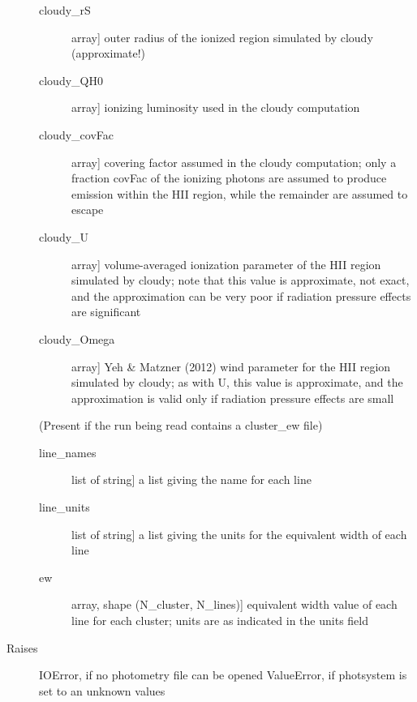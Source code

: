 \documentclass[letterpaper,10pt,english]{sphinxmanual}
\begin{document}
\begin{fulllineitems}
\begin{description}
\begin{description}
\item[{cloudy\_rS}] \leavevmode{[}array{]}
outer radius of the ionized region simulated by cloudy (approximate!)

\item[{cloudy\_QH0}] \leavevmode{[}array{]}
ionizing luminosity used in the cloudy computation

\item[{cloudy\_covFac}] \leavevmode{[}array{]}
covering factor assumed in the cloudy computation; only a
fraction covFac of the ionizing photons are assumed to
produce emission within the HII region, while the remainder
are assumed to escape

\item[{cloudy\_U}] \leavevmode{[}array{]}
volume-averaged ionization parameter of the HII region
simulated by cloudy; note that this value is approximate,
not exact, and the approximation can be very poor if
radiation pressure effects are significant

\item[{cloudy\_Omega}] \leavevmode{[}array{]}
Yeh \& Matzner (2012) wind parameter for the HII region
simulated by cloudy; as with U, this value is approximate,
and the approximation is valid only if radiation pressure
effects are small

\end{description}

(Present if the run being read contains a cluster\_ew file)
\begin{description}
\item[{line\_names}] \leavevmode{[}list of string{]}
a list giving the name for each line

\item[{line\_units}] \leavevmode{[}list of string{]}
a list giving the units for the equivalent width of each line

\item[{ew}] \leavevmode{[}array, shape (N\_cluster, N\_lines){]}
equivalent width value of each line for each cluster; 
units are as indicated in the units field

\end{description}

\item[{Raises}] \leavevmode
IOError, if no photometry file can be opened
ValueError, if photsystem is set to an unknown values

\end{description}

\end{fulllineitems}
\end{document}
